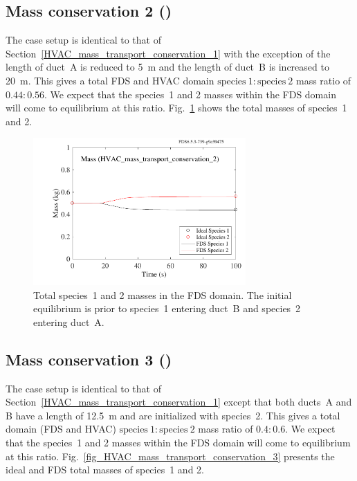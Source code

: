 \documentclass[11pt]{book}
\begin{document}
\subsection{Mass conservation 2 (\texorpdfstring{}{HVAC\_mass\_transport\_conservation\_2})}
\label{HVAC_mass_transport_conservation_2}
The case setup is identical to that of Section~\ref{HVAC_mass_transport_conservation_1} with the exception of the length of duct~A is reduced to \SI{5}{\meter} and the length of duct~B is increased to \SI{20}{\meter}. This gives a total FDS and HVAC domain \(\text{species}\ 1 \colon \text{species}\ 2\) mass ratio of \(0.44 \colon 0.56\). We expect that the species~1 and 2 masses within the FDS domain will come to equilibrium at this ratio. Fig.~\ref{fig_HVAC_mass_transport_conservation_2} shows the total masses of species~1 and 2.

\begin{figure}[ht]
\centering
\includegraphics[width=3.2in]{SCRIPT_FIGURES/HVAC_mass_transport_conservation_2}
\caption[ test case.]{Total species~1 and 2 masses in the FDS domain. The initial equilibrium is prior to species~1 entering duct~B and species~2 entering duct~A.}
\label{fig_HVAC_mass_transport_conservation_2}
\end{figure}

\subsection{Mass conservation 3 (\texorpdfstring{}{HVAC\_mass\_transport\_conservation\_3})}
\label{HVAC_mass_transport_conservation_3}
The case setup is identical to that of Section~\ref{HVAC_mass_transport_conservation_1} except that both ducts~A and B have a length of \SI{12.5}{\meter} and are initialized with species~2. This gives a total domain (FDS and HVAC) \(\text{species}\ 1 \colon \text{species}\ 2\) mass ratio of \(0.4 \colon 0.6\). We expect that the species~1 and 2 masses within the FDS domain will come to equilibrium at this ratio. Fig.~\ref{fig_HVAC_mass_transport_conservation_3} presents the ideal and FDS total masses of species~1 and 2.
\end{document}
